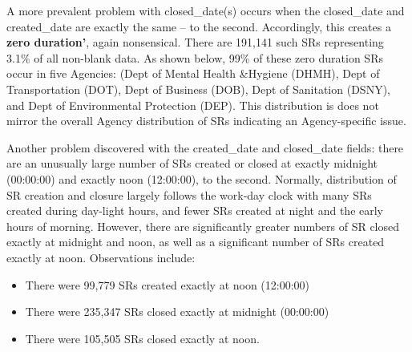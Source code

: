 \documentclass[12pt, titlepage]{article}
\begin{document}
		
	
		
\label{sec: zeroduration}		
A more prevalent problem with closed\_date(s) occurs when 
the closed\_date and created\_date are exactly the same -- to 
the second. Accordingly, this creates a \textbf{zero duration'}, again 
nonsensical. There are 191,141 such SRs representing 3.1\% of 
all non-blank data. As shown below, 99\% of these zero duration 
SRs occur in five Agencies:  (Dept of Mental Health \&Hygiene (DHMH), Dept 
of Transportation (DOT), Dept of Business (DOB), Dept of Sanitation 
(DSNY), and Dept of Environmental Protection (DEP). This distribution
is does not mirror the overall Agency distribution of SRs indicating an 
Agency-specific issue.
	
		

		
\label{sec:midnightandnoon}
Another problem discovered with the created\_date and 
closed\_date fields: there are an unusually large number of SRs 
created or closed at exactly midnight (00:00:00) and exactly noon (12:00:00), 
to the second. Normally, distribution of SR creation and closure 
largely follows the work-day clock with many SRs created during 
day-light hours, and fewer SRs 	created at night and the early hours 
of morning. However, there are significantly greater numbers 
of SR closed exactly at midnight and noon, as well as a significant 
number of SRs created exactly at noon. Observations include:

	
\begin{itemize}
	 \item There were 99,779 SRs created exactly at noon (12:00:00)
	
	 \item There were 235,347 SRs closed exactly at midnight (00:00:00)
	 
	\item There were 105,505 SRs closed exactly at noon. 
\end{itemize}
\end{document}
